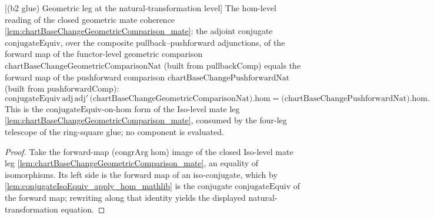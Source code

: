 \begin{lemma}

[(b2 glue) Geometric leg at the natural-transformation level]
  \label{lem:ring_square_glue_geom_leg_nat}
  The hom-level reading of the closed geometric mate coherence
  \cref{lem:chartBaseChangeGeometricComparison_mate}: the adjoint conjugate \(\mathrm{conjugateEquiv}\),
  over the composite pullback--pushforward adjunctions, of the forward map of the functor-level
  geometric comparison \(\mathrm{chartBaseChangeGeometricComparisonNat}\) (built from
  \(\mathrm{pullbackComp}\)) equals the forward map of the pushforward comparison
  \(\mathrm{chartBaseChangePushforwardNat}\) (built from \(\mathrm{pushforwardComp}\)):
  \[
    \mathrm{conjugateEquiv}\,\mathrm{adj}\,\mathrm{adj}'\,
      \bigl(\mathrm{chartBaseChangeGeometricComparisonNat}\bigr).\mathrm{hom}
      = \bigl(\mathrm{chartBaseChangePushforwardNat}\bigr).\mathrm{hom}.
  \]
  This is the \(\mathrm{conjugateEquiv}\)-on-\(\mathrm{hom}\) form of the Iso-level mate leg
  \cref{lem:chartBaseChangeGeometricComparison_mate}, consumed by the four-leg telescope of the
  ring-square glue; no component is evaluated.
  \begin{proof}
    Take the forward-map (\(\mathrm{congrArg}\;\mathrm{hom}\)) image of the closed Iso-level mate leg
    \cref{lem:chartBaseChangeGeometricComparison_mate}, an equality of isomorphisms. Its left side is
    the forward map of an iso-conjugate, which by \cref{lem:conjugateIsoEquiv_apply_hom_mathlib} is the
    conjugate \(\mathrm{conjugateEquiv}\) of the forward map; rewriting along that identity yields the
    displayed natural-transformation equation.
  \end{proof}
\end{lemma}

